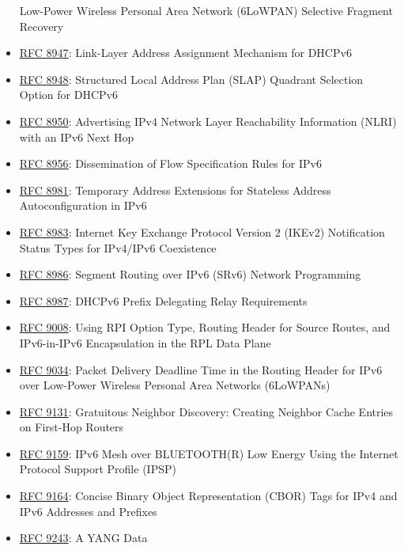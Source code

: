 \documentclass[
]{article}
\begin{document}
\begin{itemize}
  Low-Power Wireless Personal Area Network (6LoWPAN) Selective Fragment
  Recovery
\item
  \href{https://www.rfc-editor.org/info/rfc8947}{RFC 8947}: Link-Layer
  Address Assignment Mechanism for DHCPv6
\item
  \href{https://www.rfc-editor.org/info/rfc8948}{RFC 8948}: Structured
  Local Address Plan (SLAP) Quadrant Selection Option for DHCPv6
\item
  \href{https://www.rfc-editor.org/info/rfc8950}{RFC 8950}: Advertising
  IPv4 Network Layer Reachability Information (NLRI) with an IPv6 Next
  Hop
\item
  \href{https://www.rfc-editor.org/info/rfc8956}{RFC 8956}:
  Dissemination of Flow Specification Rules for IPv6
\item
  \href{https://www.rfc-editor.org/info/rfc8981}{RFC 8981}: Temporary
  Address Extensions for Stateless Address Autoconfiguration in IPv6
\item
  \href{https://www.rfc-editor.org/info/rfc8983}{RFC 8983}: Internet Key
  Exchange Protocol Version 2 (IKEv2) Notification Status Types for
  IPv4/IPv6 Coexistence
\item
  \href{https://www.rfc-editor.org/info/rfc8986}{RFC 8986}: Segment
  Routing over IPv6 (SRv6) Network Programming
\item
  \href{https://www.rfc-editor.org/info/rfc8987}{RFC 8987}: DHCPv6
  Prefix Delegating Relay Requirements
\item
  \href{https://www.rfc-editor.org/info/rfc9008}{RFC 9008}: Using RPI
  Option Type, Routing Header for Source Routes, and IPv6-in-IPv6
  Encapsulation in the RPL Data Plane
\item
  \href{https://www.rfc-editor.org/info/rfc9034}{RFC 9034}: Packet
  Delivery Deadline Time in the Routing Header for IPv6 over Low-Power
  Wireless Personal Area Networks (6LoWPANs)
\item
  \href{https://www.rfc-editor.org/info/rfc9131}{RFC 9131}: Gratuitous
  Neighbor Discovery: Creating Neighbor Cache Entries on First-Hop
  Routers
\item
  \href{https://www.rfc-editor.org/info/rfc9159}{RFC 9159}: IPv6 Mesh
  over BLUETOOTH(R) Low Energy Using the Internet Protocol Support
  Profile (IPSP)
\item
  \href{https://www.rfc-editor.org/info/rfc9164}{RFC 9164}: Concise
  Binary Object Representation (CBOR) Tags for IPv4 and IPv6 Addresses
  and Prefixes
\item
  \href{https://www.rfc-editor.org/info/rfc9243}{RFC 9243}: A YANG Data

\end{itemize}
\end{document}
